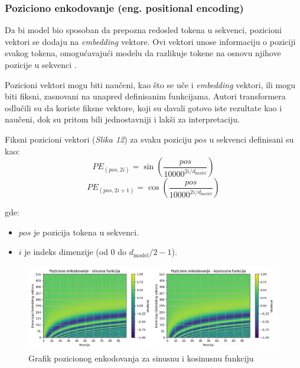 \documentclass[12pt]{article}
\begin{document}
   \newpage

   \subsubsection*{Poziciono enkodovanje (eng. positional encoding)}
   Da bi model bio sposoban da prepozna redosled tokena u sekvenci, pozicioni vektori 
   se dodaju na \textit{embedding} vektore. Ovi vektori unose informaciju o poziciji 
   svakog tokena, omogućavajući modelu da razlikuje tokene na osnovu njihove pozicije 
   u sekvenci \cite{attentionneed}.

   Pozicioni vektori mogu biti naučeni, kao što se uče i \textit{embedding} vektori, ili mogu biti fiksni, 
   zasnovani na unapred definisanim funkcijama. Autori transformera odlučili su da 
   koriste fiksne vektore, koji su davali gotovo iste rezultate kao i naučeni, 
   dok su pritom bili jednostavniji i lakši za interpretaciju.

   Fiksni pozicioni vektori (\textit{Slika 12}) za svaku poziciju \( pos \) u sekvenci definisani su kao:
   \[
      PE_{(pos, 2i)} = \sin\left(\frac{pos}{10000^{2i/d_{\text{model}}}}\right)
   \]
   \vspace{-0.5cm}
   \[
         PE_{(pos, 2i+1)} = \cos\left(\frac{pos}{10000^{2i/d_{\text{model}}}}\right)
   \]
         
   gde:
   \begin{itemize}
      \vspace{-0.5cm}
      \item \( pos \) je pozicija tokena u sekvenci.
      \item \( i \) je indeks dimenzije (od 0 do \( d_{\text{model}}/2 - 1 \)).
   \end{itemize}

   \begin{figure}[h!]
      \hspace{-2cm} %
      \includegraphics[width=1.3\textwidth]{pos_encoding.png}
      \caption{Grafik pozicionog enkodovanja za sinusnu i kosinusnu funkciju}
      \label{fig:pos_encoding}
   \end{figure}
\end{document}
